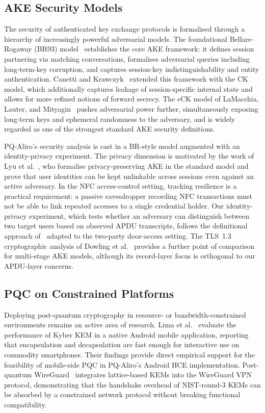 \subsection{AKE Security Models}
\label{sec:related:models}

The security of authenticated key exchange protocols is formalised through a
hierarchy of increasingly powerful adversarial models.
The foundational Bellare--Rogaway (BR93) model~\cite{C:BelRog93} establishes
the core AKE framework: it defines session partnering via matching
conversations, formalises adversarial queries including long-term-key
corruption, and captures session-key indistinguishability and entity
authentication.
Canetti and Krawczyk~\cite{EC:CanKra01} extended this framework with the CK
model, which additionally captures leakage of session-specific internal state
and allows for more refined notions of forward secrecy.
The eCK model of LaMacchia, Lauter, and Mityagin~\cite{PROVSEC:LaMLauMit07}
pushes adversarial power further, simultaneously exposing long-term keys and
ephemeral randomness to the adversary, and is widely regarded as one of the
strongest standard AKE security definitions.

PQ-Aliro's security analysis is cast in a BR-style model augmented with an
identity-privacy experiment.
The privacy dimension is motivated by the work of Lyu et al.~\cite{AC:LLHG22},
who formalise privacy-preserving AKE in the standard model and prove that user
identities can be kept unlinkable across sessions even against an active
adversary.
In the NFC access-control setting, tracking resilience is a practical
requirement: a passive eavesdropper recording NFC transactions must not be able
to link repeated accesses to a single credential holder.
Our identity-privacy experiment, which tests whether an adversary can
distinguish between two target users based on observed APDU transcripts,
follows the definitional approach of~\cite{AC:LLHG22} adapted to the two-party
door-access setting.
The TLS~1.3 cryptographic analysis of Dowling et al.~\cite{JC:DFGS21} provides
a further point of comparison for multi-stage AKE models, although its
record-layer focus is orthogonal to our APDU-layer concerns.

\subsection{PQC on Constrained Platforms}
\label{sec:related:constrained}

Deploying post-quantum cryptography in resource- or bandwidth-constrained
environments remains an active area of research.
Lima et al.~\cite{NIST3PQC:Lima21} evaluate the performance of Kyber KEM in a
native Android mobile application, reporting that encapsulation and
decapsulation are fast enough for interactive use on commodity smartphones.
Their findings provide direct empirical support for the feasibility of
mobile-side PQC in PQ-Aliro's Android HCE implementation.
Post-quantum WireGuard~\cite{SP:HNSWZ21} integrates lattice-based KEMs into the
WireGuard VPN protocol, demonstrating that the handshake overhead of
NIST-round-3 KEMs can be absorbed by a constrained network protocol without
breaking functional compatibility.

